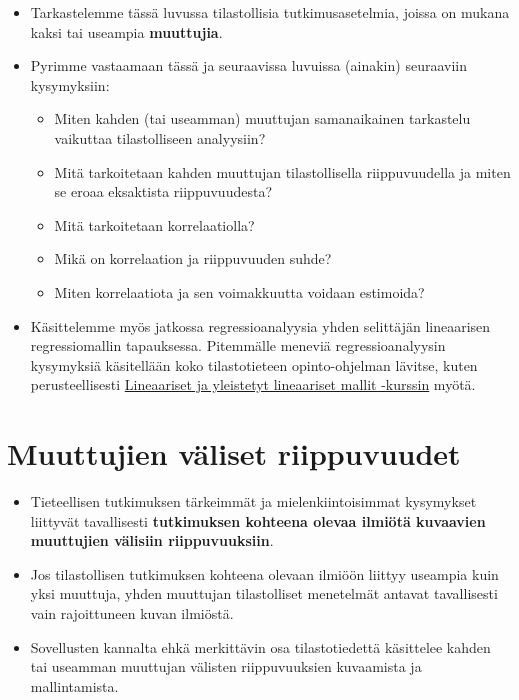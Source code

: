 \documentclass[
]{book}
\providecommand{\tightlist}{%
  \setlength{\itemsep}{0pt}\setlength{\parskip}{0pt}}
\begin{document}
\begin{itemize}
\item
  Tarkastelemme tässä luvussa tilastollisia tutkimusasetelmia, joissa on mukana kaksi tai useampia \textbf{muuttujia}.
\item
  Pyrimme vastaamaan tässä ja seuraavissa luvuissa (ainakin) seuraaviin kysymyksiin:

  \begin{itemize}
  \tightlist
  \item
    Miten kahden (tai useamman) muuttujan samanaikainen tarkastelu vaikuttaa tilastolliseen analyysiin?
  \item
    Mitä tarkoitetaan kahden muuttujan tilastollisella riippuvuudella ja miten se eroaa eksaktista riippuvuudesta?
  \item
    Mitä tarkoitetaan korrelaatiolla?
  \item
    Mikä on korrelaation ja riippuvuuden suhde?
  \item
    Miten korrelaatiota ja sen voimakkuutta voidaan estimoida?
  \end{itemize}
\item
  Käsittelemme myös jatkossa regressioanalyysia yhden selittäjän lineaarisen regressiomallin tapauksessa. Pitemmälle meneviä regressioanalyysin kysymyksiä käsitellään koko tilastotieteen opinto-ohjelman lävitse, kuten perusteellisesti \href{https://opas.peppi.utu.fi/fi/opintojakso/TILM3588/5071?period=2022-2024}{Lineaariset ja yleistetyt lineaariset mallit -kurssin} myötä.
\end{itemize}

\hypertarget{alaluku61}{%
\section{Muuttujien väliset riippuvuudet}\label{alaluku61}}

\begin{itemize}
\item
  Tieteellisen tutkimuksen tärkeimmät ja mielenkiintoisimmat kysymykset liittyvät tavallisesti \textbf{tutkimuksen kohteena olevaa ilmiötä kuvaavien muuttujien välisiin riippuvuuksiin}.
\item
  Jos tilastollisen tutkimuksen kohteena olevaan ilmiöön liittyy useampia kuin yksi muuttuja, yhden muuttujan tilastolliset menetelmät antavat tavallisesti vain rajoittuneen kuvan ilmiöstä.
\item
  Sovellusten kannalta ehkä merkittävin osa tilastotiedettä käsittelee kahden tai useamman muuttujan välisten riippuvuuksien kuvaamista ja mallintamista.
\end{itemize}
\end{document}
